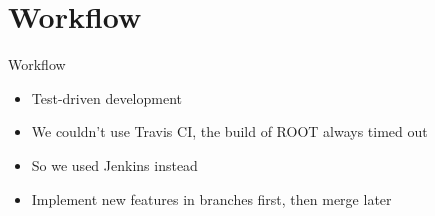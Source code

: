 \section{Workflow}

\begin{frame}{Workflow}
\begin{itemize}
	\item Test-driven development
	\item We couldn't use Travis CI, the build of ROOT always timed out
	\item So we used Jenkins instead
	\item Implement new features in branches first, then merge later
\end{itemize}
\end{frame}
